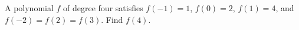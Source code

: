 A polynomial $f$ of degree four satisfies $f(-1)=1$, $f(0)=2$, $f(1)=4$, and $f(-2)=f(2)=f(3)$. Find $f(4)$.
